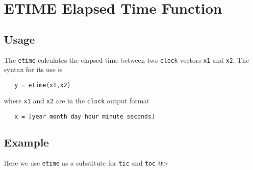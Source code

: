 \section{ETIME Elapsed Time Function}

\subsection{Usage}

The \verb|etime| calculates the elapsed time between two \verb|clock| vectors
\verb|x1| and \verb|x2|.  The syntax for its use is
\begin{verbatim}
   y = etime(x1,x2)
\end{verbatim}
where \verb|x1| and \verb|x2| are in the \verb|clock| output format
\begin{verbatim}
   x = [year month day hour minute seconds]
\end{verbatim}
\subsection{Example}

Here we use \verb|etime| as a substitute for \verb|tic| and \verb|toc|
@>
